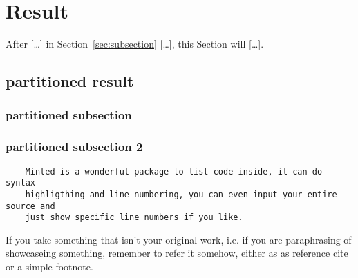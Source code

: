\section{Result}
\label{sec:Result}

After [\dots] in Section~\ref{sec:subsection} [\dots], this Section will [\dots].







\subsection{partitioned result}
\label{sec:???}

\subsubsection{partitioned subsection}
\label{sec:???_2}


\subsubsection{partitioned subsection 2}


\begin{listing}[H]
	\begin{verbatim}
	Minted is a wonderful package to list code inside, it can do syntax
	highligthing and line numbering, you can even input your entire source and 
	just show specific line numbers if you like.
	\end{verbatim}
	\caption[]{If you take something that isn't your original work, i.e. if you are paraphrasing of showcaseing something, remember to refer it somehow, either as as reference cite or a simple footnote.\footnotemark }
	\label{lst:explanation}
\end{listing}

